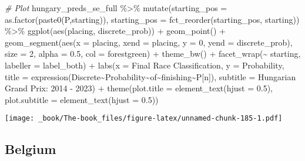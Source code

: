 \documentclass[
]{book}
\newenvironment{Shaded}{\begin{snugshade}}{\end{snugshade}}
\newcommand{\AttributeTok}[1]{\textcolor[rgb]{0.77,0.63,0.00}{#1}}
\newcommand{\CommentTok}[1]{\textcolor[rgb]{0.56,0.35,0.01}{\textit{#1}}}
\newcommand{\DecValTok}[1]{\textcolor[rgb]{0.00,0.00,0.81}{#1}}
\newcommand{\FloatTok}[1]{\textcolor[rgb]{0.00,0.00,0.81}{#1}}
\newcommand{\FunctionTok}[1]{\textcolor[rgb]{0.00,0.00,0.00}{#1}}
\newcommand{\NormalTok}[1]{#1}
\newcommand{\SpecialCharTok}[1]{\textcolor[rgb]{0.00,0.00,0.00}{#1}}
\newcommand{\StringTok}[1]{\textcolor[rgb]{0.31,0.60,0.02}{#1}}
\begin{document}
\begin{Shaded}
\begin{Highlighting}[]
\CommentTok{\# Plot}
\NormalTok{hungary\_preds\_se\_full }\SpecialCharTok{\%\textgreater{}\%}
  \FunctionTok{mutate}\NormalTok{(}\AttributeTok{starting\_pos =} \FunctionTok{as.factor}\NormalTok{(}\FunctionTok{paste0}\NormalTok{(}\StringTok{\textquotesingle{}P\textquotesingle{}}\NormalTok{,starting)),}
         \AttributeTok{starting\_pos =} \FunctionTok{fct\_reorder}\NormalTok{(starting\_pos, starting)) }\SpecialCharTok{\%\textgreater{}\%}
  \FunctionTok{ggplot}\NormalTok{(}\FunctionTok{aes}\NormalTok{(placing, discrete\_prob)) }\SpecialCharTok{+}
  \FunctionTok{geom\_point}\NormalTok{() }\SpecialCharTok{+}
  \FunctionTok{geom\_segment}\NormalTok{(}\FunctionTok{aes}\NormalTok{(}\AttributeTok{x =}\NormalTok{ placing, }\AttributeTok{xend =}\NormalTok{ placing, }\AttributeTok{y =} \DecValTok{0}\NormalTok{, }\AttributeTok{yend =}\NormalTok{ discrete\_prob),}
               \AttributeTok{size =} \DecValTok{2}\NormalTok{, }\AttributeTok{alpha =} \FloatTok{0.5}\NormalTok{, }\AttributeTok{col =} \StringTok{\textquotesingle{}forestgreen\textquotesingle{}}\NormalTok{) }\SpecialCharTok{+}
  \FunctionTok{theme\_bw}\NormalTok{() }\SpecialCharTok{+}
  \FunctionTok{facet\_wrap}\NormalTok{(}\SpecialCharTok{\textasciitilde{}}\NormalTok{ starting, }\AttributeTok{labeller =}\NormalTok{ label\_both) }\SpecialCharTok{+}
  \FunctionTok{labs}\NormalTok{(}\AttributeTok{x =} \StringTok{\textquotesingle{}Final Race Classification\textquotesingle{}}\NormalTok{,}
       \AttributeTok{y =} \StringTok{\textquotesingle{}Probability\textquotesingle{}}\NormalTok{,}
       \AttributeTok{title =} \FunctionTok{expression}\NormalTok{(Discrete}\SpecialCharTok{\textasciitilde{}}\NormalTok{Probability}\SpecialCharTok{\textasciitilde{}}\NormalTok{of}\SpecialCharTok{\textasciitilde{}}\NormalTok{finishing}\SpecialCharTok{\textasciitilde{}}\NormalTok{P[n]),}
       \AttributeTok{subtitle =} \StringTok{\textquotesingle{}Hungarian Grand Prix: 2014 {-} 2023\textquotesingle{}}\NormalTok{) }\SpecialCharTok{+}
  \FunctionTok{theme}\NormalTok{(}\AttributeTok{plot.title =} \FunctionTok{element\_text}\NormalTok{(}\AttributeTok{hjust =} \FloatTok{0.5}\NormalTok{),}
        \AttributeTok{plot.subtitle =} \FunctionTok{element\_text}\NormalTok{(}\AttributeTok{hjust =} \FloatTok{0.5}\NormalTok{)) }
\end{Highlighting}
\end{Shaded}

\texttt{[image: \_book/The-book\_files/figure-latex/unnamed-chunk-185-1.pdf]}

\hypertarget{belgium}{%
\subsection{Belgium}\label{belgium}}
\end{document}
